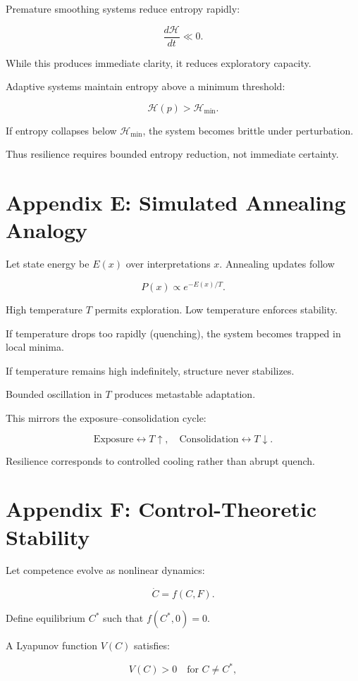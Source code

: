 \documentclass[12pt]{article}
\begin{document}
Premature smoothing systems reduce entropy rapidly:

\[
\frac{d\mathcal{H}}{dt} \ll 0.
\]

While this produces immediate clarity, it reduces exploratory capacity.

Adaptive systems maintain entropy above a minimum threshold:

\[
\mathcal{H}(p) > \mathcal{H}_{\min}.
\]

If entropy collapses below $\mathcal{H}_{\min}$,
the system becomes brittle under perturbation.

Thus resilience requires bounded entropy reduction,
not immediate certainty.


\section*{Appendix E: Simulated Annealing Analogy}

Let state energy be $E(x)$ over interpretations $x$.
Annealing updates follow

\[
P(x) \propto e^{-E(x)/T}.
\]

High temperature $T$ permits exploration.
Low temperature enforces stability.

If temperature drops too rapidly (quenching),
the system becomes trapped in local minima.

If temperature remains high indefinitely,
structure never stabilizes.

Bounded oscillation in $T$ produces metastable adaptation.

This mirrors the exposure–consolidation cycle:

\[
\text{Exposure} \leftrightarrow T \uparrow,
\quad
\text{Consolidation} \leftrightarrow T \downarrow.
\]

Resilience corresponds to controlled cooling rather than abrupt quench.


\section*{Appendix F: Control-Theoretic Stability}

Let competence evolve as nonlinear dynamics:

\[
\dot{C} = f(C, F).
\]

Define equilibrium $C^*$ such that $f(C^*,0)=0$.

A Lyapunov function $V(C)$ satisfies:

\[
V(C) > 0 \quad \text{for } C \neq C^*,
\]
\end{document}
